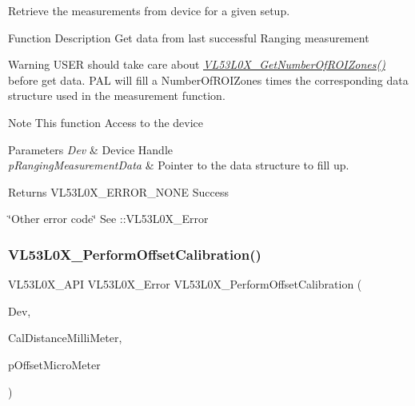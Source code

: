 Retrieve the measurements from device for a given setup. 

\begin{DoxyParagraph}{Function Description}
Get data from last successful Ranging measurement 
\end{DoxyParagraph}
\begin{DoxyWarning}{Warning}
U\+S\+ER should take care about {\itshape \hyperlink{group__VL53L0X__measurement__group_gad345958f05c6b130f35c569dd0d0e4f8}{V\+L53\+L0\+X\+\_\+\+Get\+Number\+Of\+R\+O\+I\+Zones()}} before get data. P\+AL will fill a Number\+Of\+R\+O\+I\+Zones times the corresponding data structure used in the measurement function.
\end{DoxyWarning}
\begin{DoxyNote}{Note}
This function Access to the device
\end{DoxyNote}

\begin{DoxyParams}{Parameters}
{\em Dev} & Device Handle \\
\hline
{\em p\+Ranging\+Measurement\+Data} & Pointer to the data structure to fill up. \\
\hline
\end{DoxyParams}
\begin{DoxyReturn}{Returns}
V\+L53\+L0\+X\+\_\+\+E\+R\+R\+O\+R\+\_\+\+N\+O\+NE Success 

\char`\"{}\+Other error code\char`\"{} See \+::\+V\+L53\+L0\+X\+\_\+\+Error 
\end{DoxyReturn}
\mbox{\label{group__VL53L0X__measurement__group_gab33cdad2e9d45dd096b784b17013df3e}} 
\subsubsection{\texorpdfstring{V\+L53\+L0\+X\+\_\+\+Perform\+Offset\+Calibration()}{VL53L0X\_PerformOffsetCalibration()}}
{\footnotesize\ttfamily V\+L53\+L0\+X\+\_\+\+A\+PI V\+L53\+L0\+X\+\_\+\+Error V\+L53\+L0\+X\+\_\+\+Perform\+Offset\+Calibration (\begin{DoxyParamCaption}\item[{\hyperlink{group__VL53L0X__platform__group_ga2d6405308b1dd524b462f1b8fb97d167}{V\+L53\+L0\+X\+\_\+\+D\+EV}}]{Dev,  }\item[{\hyperlink{vl53l0x__types_8h_afb910790161809fc76e1a274a6349384}{Fix\+Point1616\+\_\+t}}]{Cal\+Distance\+Milli\+Meter,  }\item[{\hyperlink{vl53l0x__types_8h_a32f2e37ee053cf2ce8ca28d1f74630e5}{int32\+\_\+t} $\ast$}]{p\+Offset\+Micro\+Meter }\end{DoxyParamCaption})}



